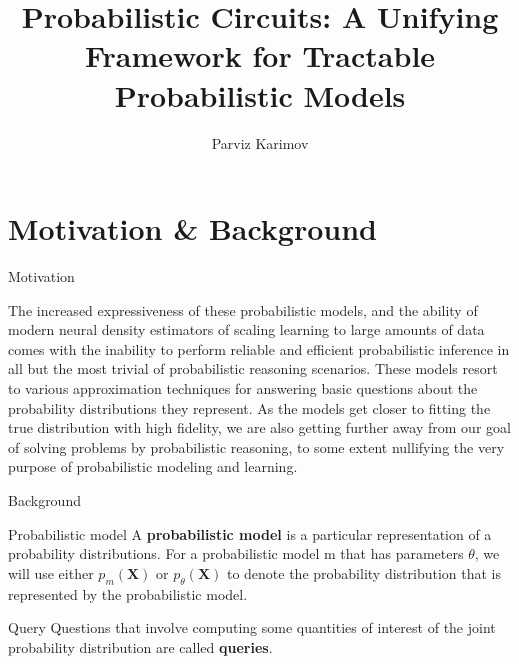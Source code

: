 \documentclass{beamer}
\title{Probabilistic Circuits:
A Unifying Framework for Tractable Probabilistic Models}
\author{Parviz Karimov}
\institute{MIPT, 2023}
\begin{document}
\begin{frame}
    \titlepage
\end{frame}


\begin{frame}
    \tableofcontents
\end{frame}


\section{Motivation \& Background}

\begin{frame}{Motivation}
    \begin{block}{}
         The increased expressiveness of these probabilistic models, and the ability of
        modern neural density estimators of scaling learning to large amounts of data comes with the inability to perform reliable and efficient probabilistic inference in all
        but the most trivial of probabilistic reasoning scenarios. These
        models resort to various approximation techniques for answering basic questions about the
        probability distributions they represent.
        As the models get closer to fitting the true distribution with high fidelity, we are also getting further away from our goal of solving problems by
        probabilistic reasoning, to some extent nullifying the very purpose of probabilistic modeling
        and learning.
    \end{block} 
\end{frame}


\begin{frame}{Background}
	\begin{block}{Probabilistic model}
        A \textbf{probabilistic model} is a particular representation of a probability distributions. For
        a probabilistic model m that has parameters $\theta$, we will use either $p_m(\mathbf{X})$ or $p_{\theta}(\mathbf{X})$ to denote
        the probability distribution that is represented by the probabilistic model.
	\end{block}
    
    \begin{block}{Query}
        Questions that involve computing some quantities of interest of the joint probability distribution are called \textbf{queries}.
    \end{block}
\end{frame}
\end{document}
